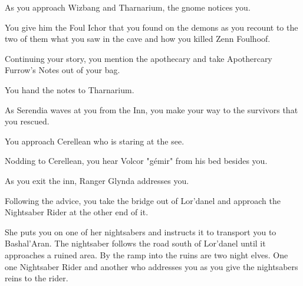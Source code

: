 As you approach Wizbang and Tharnarium, the gnome notices you.


You give him the Foul Ichor that you found on the demons as you recount to the two of them what you saw in the cave and how you killed Zenn Foulhoof.




Continuing your story, you mention the apothecary and take Apothercary Furrow's Notes out of your bag.


You hand the notes to Tharnarium.


As Serendia waves at you from the Inn, you make your way to the survivors that you rescued.  %

You approach Cerellean who is staring at the see.


Nodding to Cerellean, you hear Volcor "gémir" from his bed besides you.


As you exit the inn, Ranger Glynda addresses you.



Following the advice, you take the bridge out of Lor'danel and approach the Nightsaber Rider at the other end of it.


She puts you on one of her nightsabers and instructs it to transport you to Bashal'Aran. The nightsaber follows the road south of Lor'danel until it approaches a ruined area. By the ramp into the ruins are two night elves. One one Nightsaber Rider and another who addresses you as you give the nightsabers reins to the rider.

